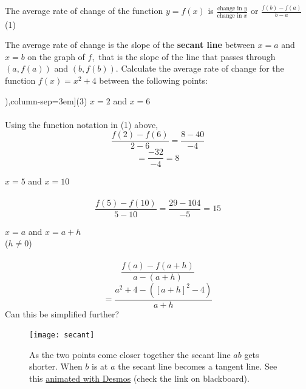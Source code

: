 The average rate of change of the function $\displaystyle y =f (x)$ is $\displaystyle\frac{\text{change in }y}{\text{change in }x}$ or $\displaystyle\frac{f (b) -f (a)}{b -a}$\hfill(1)

The average rate of change is the slope of the \textbf{secant line} between $x =a$ and $x =b$ on the graph of $f$,\ that is the slope of the line that passes through $(a ,f (a))$ and $(b ,f (b))$. 
\clearpage
\example Calculate the average rate of change for the function $f (x) =x^{2} +4$ between the following points:
\begin{tasks}[counter-format=(tsk[1]),column-sep=3em](3)
\task $x =2$ and $x =6$ \\
\solution\\ Using the function notation in (1) above, \[\frac{f(2)-f(6)}{2-6}=\frac{8-40}{-4}\]
\[=\frac{-32}{-4}=8\]

\task $x =5$ and $x =10$ \\
\solution\\
\[\frac{f(5)-f(10)}{5-10}=\frac{29-104}{-5}=15\]

\task $x =a$ and $x =a +h$\\ ($h \neq 0$) \\
\solution\\
\[\frac{f(a)-f(a+h)}{a-(a+h)}\]
\[=\frac{a^2+4-([a+h]^2-4)}{a+h}\]
Can this be simplified further?
\end{tasks}
\begin{figure}\begin{center}
\texttt{[image: secant]}
\caption{As the two points come closer together the secant line $ab$ gets shorter. When $b$ is at $a$ the secant line becomes a tangent line. See this \href{https://www.desmos.com/calculator/1zlwbppkuh}{animated with Desmos} (check the link on blackboard).}\end{center}
\end{figure}

